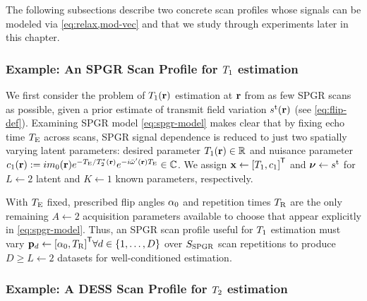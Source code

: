 The following subsections
describe two concrete scan profiles
whose signals can be modeled 
via \eqref{eq:relax,mod-vec} 
and that we study through experiments
later in this chapter.

\subsubsection{Example: An SPGR Scan Profile for $T_1$ estimation}
\label{sss,relax,meth,sig,t1}

We first consider the problem
of $\To\pr$ estimation at $\mathbf{r}$ 
from as few SPGR scans as possible,
given a prior estimate
of transmit field variation $\stx\pr$
(see \eqref{eq:flip-def}).
Examining SPGR model \eqref{eq:spgr-model}
makes clear that 
by fixing echo time $T_\mathrm{E}$ across scans, 
SPGR signal dependence is reduced 
to just two spatially varying latent parameters:
desired parameter $\To\pr \in \real$ and 
nuisance parameter 
$\const{1}\pr := i\mzero\pr e^{-\TE/\Tts\pr} e^{-i\ompmed\pr \TE} \in \complex$.
We assign $\bmx \gets \brac{\To, \const{1}}\tpose$ and $\boldsymbol{\nu} \gets s^{\mathrm{t}}$
for $L \gets 2$ latent 
and $K \gets 1$ known parameters, respectively.

With $T_\mathrm{E}$ fixed, 
prescribed flip angles $\alpha_0$ 
and repetition times $T_\mathrm{R}$ 
are the only remaining $A \gets 2$ 
acquisition parameters
available to choose
that appear explicitly in \eqref{eq:spgr-model}.
Thus, an SPGR scan profile 
useful for $T_1$ estimation 
must vary 
$\bmp_d \gets \brac{\flipnom, \TR}\tpose
\forall d \in \set{1,\dots,D}$
over $S_{\mathrm{SPGR}}$ scan repetitions
to produce $D \geq L \gets 2$ datasets
for well-conditioned estimation.

\subsubsection{Example: A DESS Scan Profile for $T_2$ estimation}
\label{sss,relax,meth,sig,t2}

